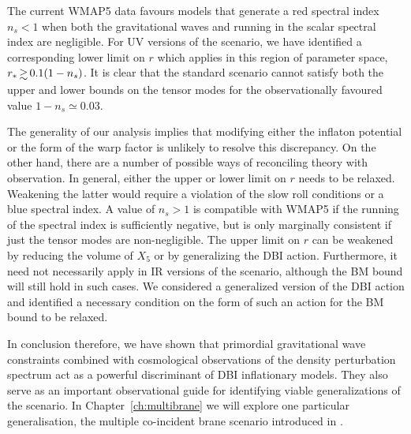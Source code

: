The current WMAP5 data 
favours models that generate a red spectral index $n_s<1$
when both the gravitational waves and running in the scalar 
spectral index are negligible. For UV versions of the scenario, 
we have identified a corresponding 
lower limit on $r$ which applies in this region of 
parameter space, $r_* \, \gsim \, 0.1 (1-n_s)$. It is clear that 
the standard scenario 
cannot satisfy both the upper and lower bounds 
on the tensor modes for the observationally favoured value 
$1-n_s \simeq 0.03$.


The generality of our 
analysis implies that modifying either the inflaton potential 
or the form of the warp factor is unlikely to resolve this discrepancy. 
On the other hand, there are a number of possible ways of reconciling  
theory with observation. In general, 
either the upper or lower limit on $r$ needs to be relaxed. 
Weakening the latter would require a violation of the slow roll 
conditions or a blue spectral index. 
A value of $n_s >1$ is compatible with WMAP5 if the running of the 
spectral index 
is sufficiently negative, but is only marginally
consistent if just the tensor modes are non-negligible.  The 
upper limit on $r$ can be weakened by reducing 
the volume of $X_5$ or 
by generalizing the DBI action. Furthermore, it need not necessarily 
apply in IR versions of the scenario, although the BM bound will still hold
in such cases. 
We considered a generalized version of the 
DBI action and identified a necessary condition on the form of such  
an action for the BM bound to be relaxed.






In conclusion therefore, we have shown that primordial gravitational wave constraints 
combined with cosmological observations of the density perturbation
spectrum act as a powerful discriminant of DBI inflationary models. 
They also serve as an important observational guide for identifying viable 
generalizations of the scenario. In Chapter~\ref{ch:multibrane} we will explore
one particular generalisation, the multiple co-incident brane scenario
introduced in .
